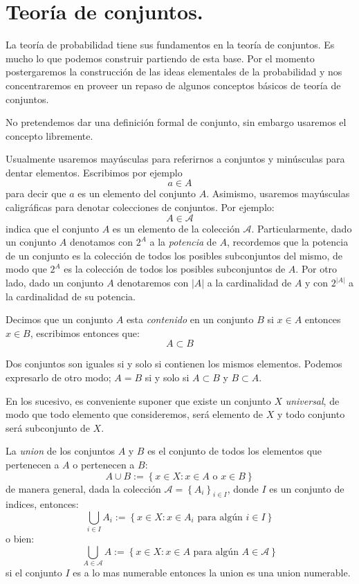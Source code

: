 \documentclass[14pt]{extbook}
\begin{document}
\chapter{Teoría de conjuntos.}

La teoría de probabilidad tiene sus fundamentos en la teoría de conjuntos. Es mucho lo que podemos construir partiendo de esta base. Por el momento postergaremos la construcción de las ideas elementales de la probabilidad y nos concentraremos en proveer un repaso de algunos conceptos básicos de teoría de conjuntos.

No pretendemos dar una definición formal de conjunto, sin embargo usaremos el concepto libremente. 


Usualmente usaremos mayúsculas para referirnos a conjuntos y minúsculas para dentar elementos. Escribimos por ejemplo
$$
a \in A 
$$
para decir que $a$ es un elemento del conjunto $A$. Asimismo, usaremos mayúsculas caligráficas para denotar colecciones de conjuntos. Por ejemplo:
$$
A\in \mathcal{A}
$$
indica que el conjunto $A$ es un elemento de la colección $\mathcal{A}$.
Particularmente, dado un conjunto $A$ denotamos con $2^A$ a la \emph{potencia} de $A$, recordemos que la potencia de un conjunto es la colección de todos los posibles subconjuntos del mismo, de modo que $2^A$ es la colección de todos los posibles subconjuntos de $A$. Por otro lado, dado un conjunto $A$ denotaremos con $\vert A \vert$ a la cardinalidad de $A$ y con $2^{\vert A \vert}$ a la cardinalidad de su potencia.


Decimos que un conjunto $A$ esta \emph{contenido} en un conjunto $B$ si $x\in A$ entonces $x \in B$, escribimos entonces que:
$$
A\subset B
$$

Dos conjuntos son iguales si y solo si contienen los mismos elementos. Podemos expresarlo de otro modo; $A = B$ si y solo si $A\subset B$ y $B \subset A$.

En los sucesivo, es conveniente suponer que existe un conjunto $X$ \emph{universal}, de modo que todo elemento que consideremos, será elemento de $X$ y todo conjunto será subconjunto de $X$.

La \emph{union} de los conjuntos $A$ y $B$ es el conjunto de todos los elementos que pertenecen a $A$ o pertenecen a $B$:
$$
A\cup B := \left\{x \in X: x \in A \text{ o } x \in B\right\}
$$
de manera general, dada la colección $\mathcal{A} = \left\{A_i\right\}_{i\in I}$, donde $I$ es un conjunto de indices, entonces:
$$
\bigcup_{i\in I}A_i := \left\{x \in X: x \in A_i \text{ para algún } i\in I \right\}
$$
\noindent
o bien:
\noindent
$$
\bigcup_{A\in \mathcal{A}}A := \left\{x\in X: x \in A \text{ para algún } A\in \mathcal{A} \right\}
$$
si el conjunto $I$ es a lo mas numerable entonces la union es una union numerable. 
\end{document}
